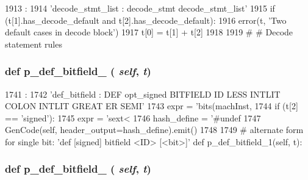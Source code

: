 \begin{DoxyCode}
1913                                      :
1914         'decode_stmt_list : decode_stmt decode_stmt_list'
1915         if (t[1].has_decode_default and t[2].has_decode_default):
1916             error(t, 'Two default cases in decode block')
1917         t[0] = t[1] + t[2]
1918 
1919     #
    # Decode statement rules
\end{DoxyCode}
\hypertarget{classisa__parser_1_1ISAParser_a090c7359fa45ffd50a877ab89a811ff1}{
\subsubsection[{p\_\-def\_\-bitfield\_\-0}]{\setlength{\rightskip}{0pt plus 5cm}def p\_\-def\_\-bitfield\_ ( {\em self}, \/   {\em t})}}
\label{classisa__parser_1_1ISAParser_a090c7359fa45ffd50a877ab89a811ff1}



\begin{DoxyCode}
1741                                  :
1742         'def_bitfield : DEF opt_signed BITFIELD ID LESS INTLIT COLON INTLIT GREAT
      ER SEMI'
1743         expr = 'bits(machInst, %
1744         if (t[2] == 'signed'):
1745             expr = 'sext<%
1746         hash_define = '#undef %
1747         GenCode(self, header_output=hash_define).emit()
1748 
1749     # alternate form for single bit: 'def [signed] bitfield <ID> [<bit>]'
    def p_def_bitfield_1(self, t):
\end{DoxyCode}
\hypertarget{classisa__parser_1_1ISAParser_a9f258c630a4f9a44f5581f8f3573e8d8}{
\subsubsection[{p\_\-def\_\-bitfield\_\-1}]{\setlength{\rightskip}{0pt plus 5cm}def p\_\-def\_\-bitfield\_ ( {\em self}, \/   {\em t})}}
\label{classisa__parser_1_1ISAParser_a9f258c630a4f9a44f5581f8f3573e8d8}



